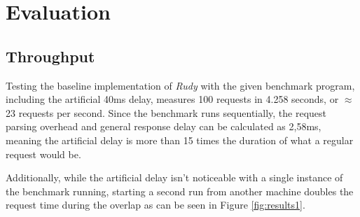 \documentclass[a4paper, 11pt]{article}
\begin{document}
\section{Evaluation}

\subsection{Throughput}

Testing the baseline implementation of \textit{Rudy} with the given benchmark program, including the artificial 40ms delay, measures 100 requests in 4.258 seconds, or $\approx$23 requests per second.
Since the benchmark runs sequentially, the request parsing overhead and general response delay can be calculated as 2,58ms, meaning the artificial delay is more than 15 times the duration of what a regular request would be.

Additionally, while the artificial delay isn't noticeable with a single instance of the benchmark running, starting a second run from another machine doubles the request time during the overlap as can be seen in Figure \ref{fig:results1}.
\end{document}
